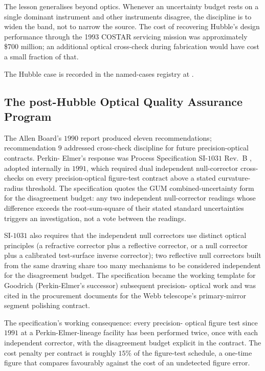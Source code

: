 The lesson generalises beyond optics. Whenever an uncertainty
budget rests on a single dominant instrument and other
instruments disagree, the discipline is to widen the band, not
to narrow the source. The cost of recovering Hubble's design
performance through the 1993 COSTAR servicing mission was
approximately \$700 million; an additional optical cross-check
during fabrication would have cost a small fraction of that.

The Hubble case is recorded in the named-cases registry at
.

\subsection{The post-Hubble Optical Quality Assurance Program}

The Allen Board's $1990$ report
\cite{acc:nasa-hubble-optical-systems-1990} produced eleven
recommendations; recommendation $9$ addressed cross-check
discipline for future precision-optical contracts. Perkin-
Elmer's response was Process Specification SI-$1031$ Rev.\ B
\cite{std:ch04t3b-perkin-elmer-si1031}, adopted internally in
$1991$, which required dual independent null-corrector
cross-checks on every precision-optical figure-test contract
above a stated curvature-radius threshold. The specification
quotes the GUM combined-uncertainty form
\cite{std:iso-iec-guide98} for the disagreement budget: any
two independent null-corrector readings whose difference
exceeds the root-sum-square of their stated standard
uncertainties triggers an investigation, not a vote between
the readings.

SI-$1031$ also requires that the independent null correctors
use distinct optical principles (a refractive corrector plus
a reflective corrector, or a null corrector plus a calibrated
test-surface inverse corrector); two reflective null
correctors built from the same drawing share too many
mechanisms to be considered independent for the disagreement
budget. The specification became the working template for
Goodrich (Perkin-Elmer's successor) subsequent precision-
optical work and was cited in the procurement documents for
the Webb telescope's primary-mirror segment polishing
contract.

The specification's working consequence: every precision-
optical figure test since $1991$ at a Perkin-Elmer-lineage
facility has been performed twice, once with each independent
corrector, with the disagreement budget explicit in the
contract. The cost penalty per contract is roughly $15\%$ of
the figure-test schedule, a one-time figure that compares
favourably against the cost of an undetected figure error.

